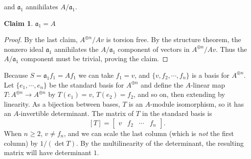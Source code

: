\documentclass[18pt]{amsart}
\newtheorem{claim}{Claim}
\begin{document}
and $\mathfrak{a_1}$ annihilates $A/\mathfrak{a}_1$.
	\begin{claim} 
		$\mathfrak{a}_1=A$
	\end{claim}
	\begin{proof}
		By the last claim, $A^{\oplus n}/Av$ is torsion free. By the structure theorem, the nonzero ideal $\mathfrak{a}_1$ annihilates the $A/\mathfrak{a}_1$ component of vectors in $A^{\oplus n}/Av$. Thus the $A/\mathfrak{a}_1$ component must be trivial, proving the claim.
	\end{proof}
Because $S=\mathfrak{a}_1 f_1=Af_1$ we can take $f_1=v$, and $\{v,f_2,\cdots,f_n\}$ is a basis for $A^{\oplus n}$. Let $\{e_1,\cdots,e_n\}$  be the standard basis for $A^{\oplus n}$ and define the $A$-linear map $T:A^{\oplus n} \to A^{\oplus n}$ by $T(e_1)=v$, $T(e_2)=f_2$, and so on, then extending by linearity. As a bijection between bases, $T$ is an $A$-module isomorphism, so it has an $A$-invertible determinant. The matrix of $T$ in the standard basis is
	\begin{equation*}
	\left[T\right]=\left[
	\begin{array}{cccc}
		v & f_2 & \cdots & f_n
	\end{array}
	\right].
	\end{equation*}
When $n\geq2$, $v \neq f_n$, and we can scale the last column (which is \emph{not} the first column) by $1/(\det T)$. By the multilinearity of the determinant, the resulting matrix will have determinant $1$.
\end{document}
